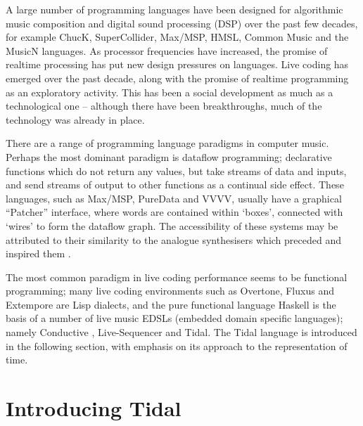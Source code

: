 \documentclass[authoryear,preprint]{sigplanconf}
\begin{document}
A large number of programming languages have been designed for
algorithmic music composition and digital sound processing (DSP) over
the past few decades, for example ChucK, SuperCollider, Max/MSP, HMSL,
Common Music and the MusicN languages. As processor frequencies have
increased, the promise of realtime processing has put new design
pressures on languages. Live coding has emerged over the past decade,
along with the promise of realtime programming as an exploratory
activity. This has been a social development as much as a
technological one -- although there have been breakthroughs, much of
the technology was already in place.

There are a range of programming language paradigms in computer
music. Perhaps the most dominant paradigm is dataflow programming;
declarative functions which do not return any values, but take streams
of data and inputs, and send streams of output to other functions as a
continual side effect. These languages, such as Max/MSP, PureData and
VVVV, usually have a graphical ``Patcher'' interface, where words are
contained within `boxes', connected with `wires' to form the dataflow
graph. The accessibility of these systems may be attributed to their
similarity to the analogue synthesisers which preceded and inspired
them \citep{Puckette88}.

The most common paradigm in live coding performance seems to
be functional programming; many live coding environments such as
Overtone, Fluxus and Extempore are Lisp dialects, and the pure
functional language Haskell is the basis of a number of live music
EDSLs (embedded domain specific languages); namely Conductive
\citep{Bell11}, Live-Sequencer \citep{Thielemann12} and Tidal. The
Tidal language is introduced in the following section, with emphasis
on its approach to the representation of time.

\section{Introducing Tidal}
\label{sec:intro}
\end{document}

